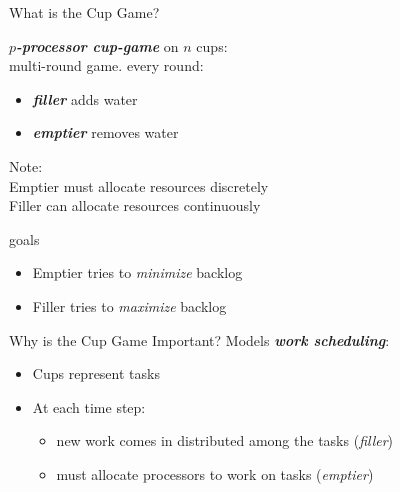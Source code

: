 \documentclass[xcolor=x11names, svgnames, rgb]{beamer}
\newcommand{\defn}[1]       {{\textit{\textbf{\boldmath #1}}}}
\begin{document}
\begin{frame}[t]{What is the Cup Game?}
  \begin{definition}
  \defn{$p$-processor cup-game} on $n$ cups: \\
  multi-round game. every round:
  \begin{itemize}
    \item \defn{filler} adds water
    \item \defn{emptier} removes water
  \end{itemize}
  \end{definition}

  \vspace{0.4cm}
  Note: \\
  Emptier must allocate resources discretely\\
  Filler can allocate resources continuously
\end{frame}

\begin{frame}[t]{goals}
  \begin{itemize}
    \item Emptier tries to \emph{minimize} backlog\\
    \item Filler tries to \emph{maximize} backlog
  \end{itemize}
\end{frame}

\begin{frame}[t]{Why is the Cup Game Important?}
  Models \defn{work scheduling}:
  \begin{itemize}
    \item Cups represent tasks
    \item At each time step:
      \begin{itemize}
        \item new work comes in distributed among the tasks (\emph{filler})
        \item must allocate processors to work on tasks (\emph{emptier})
      \end{itemize}
\end{itemize}
\end{frame}
\end{document}
